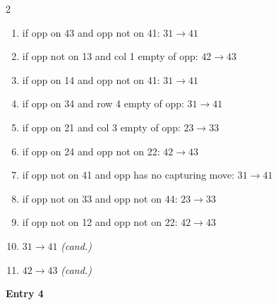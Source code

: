 \begin{multicols}{2}
\begin{tikzpicture}[scale=0.24]
\end{tikzpicture}
\nopagebreak\begin{enumerate}[topsep=1pt,itemsep=0pt,parsep=0pt,leftmargin=2.2em,label=\arabic*.]
\item if opp on 43 and opp not on 41: $31\!\to\!41$
\item if opp not on 13 and col 1 empty of opp: $42\!\to\!43$
\item if opp on 14 and opp not on 41: $31\!\to\!41$
\item if opp on 34 and row 4 empty of opp: $31\!\to\!41$
\item if opp on 21 and col 3 empty of opp: $23\!\to\!33$
\item if opp on 24 and opp not on 22: $42\!\to\!43$
\item if opp not on 41 and opp has no capturing move: $31\!\to\!41$
\item if opp not on 33 and opp not on 44: $23\!\to\!33$
\item if opp not on 12 and opp not on 22: $42\!\to\!43$
\item $31\!\to\!41$ \hfill\textit{(cand.)}
\item $42\!\to\!43$ \hfill\textit{(cand.)}
\end{enumerate}\smallskip
\noindent\textbf{Entry 4} \; 
\end{multicols}
